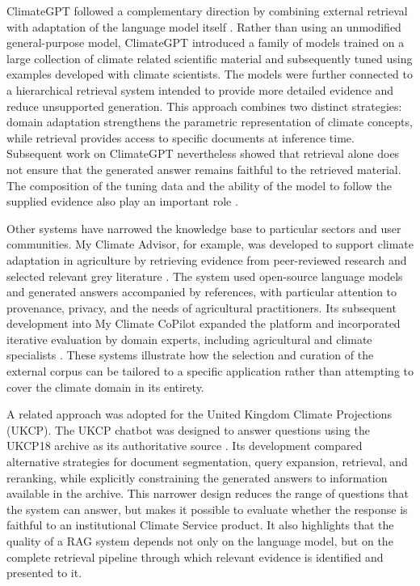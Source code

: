 ClimateGPT followed a complementary direction by combining external retrieval with adaptation of the language model itself \citep{thulke_climategpt_2024}. Rather than using an unmodified general-purpose model, ClimateGPT introduced a family of models trained on a large collection of climate related scientific material and subsequently tuned using examples developed with climate scientists. The models were further connected to a hierarchical retrieval system intended to provide more detailed evidence and reduce unsupported generation. This approach combines two distinct strategies: domain adaptation strengthens the parametric representation of climate concepts, while retrieval provides access to specific documents at inference time. Subsequent work on ClimateGPT nevertheless showed that retrieval alone does not ensure that the generated answer remains faithful to the retrieved material. The composition of the tuning data and the ability of the model to follow the supplied evidence also play an important role \citep{thulke_listen_2025}.

Other systems have narrowed the knowledge base to particular sectors and user communities. My Climate Advisor, for example, was developed to support climate adaptation in agriculture by retrieving evidence from peer-reviewed research and selected relevant grey literature \citep{nguyen_my_2024}. The system used open-source language models and generated answers accompanied by references, with particular attention to provenance, privacy, and the needs of agricultural practitioners. Its subsequent development into My Climate CoPilot expanded the platform and incorporated iterative evaluation by domain experts, including agricultural and climate specialists \citep{nguyen_my_2025}. These systems illustrate how the selection and curation of the external corpus can be tailored to a specific application rather than attempting to cover the climate domain in its entirety.

A related approach was adopted for the United Kingdom Climate Projections (UKCP). The UKCP chatbot was designed to answer questions using the UKCP18 archive as its authoritative source \citep{biswas_evaluating_2025}. Its development compared alternative strategies for document segmentation, query expansion, retrieval, and reranking, while explicitly constraining the generated answers to information available in the archive. This narrower design reduces the range of questions that the system can answer, but makes it possible to evaluate whether the response is faithful to an institutional Climate Service product. It also highlights that the quality of a RAG system depends not only on the language model, but on the complete retrieval pipeline through which relevant evidence is identified and presented to it.

